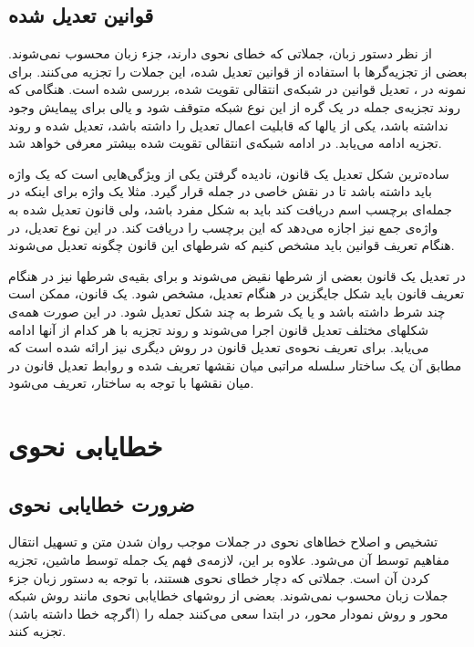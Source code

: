\documentclass{report}
\begin{document}
\subsection{قوانین تعدیل شده}
از نظر دستور زبان، جملاتی که خطای نحوی دارند، جز‌ء زبان محسوب نمی‌شوند. بعضی از تجزیه‌گرها با استفاده از قوانین تعدیل شده، این جملات را تجزیه می‌کنند. برای نمونه در \cite{ct5}، تعدیل قوانین در شبکه‌ی انتقالی تقویت شده، بررسی شده است. هنگامی که روند تجزیه‌ی جمله در یک گره از این نوع شبکه متوقف شود و یالی برای پیمایش وجود نداشته باشد، یکی از یالها که قابلیت اعمال تعدیل را داشته باشد، تعدیل شده و روند تجزیه ادامه می‌یابد. در ادامه شبکه‌ی انتقالی تقویت شده بیشتر معرفی خواهد شد.

ساده‌ترین شکل تعدیل یک قانون، نادیده‌ گرفتن یکی از ویژگی‌هایی است که یک واژه باید داشته باشد تا در نقش خاصی در جمله قرار گیرد. مثلا یک واژه برای اینکه در جمله‌ای برچسب اسم دریافت کند باید به شکل مفرد باشد، ولی قانون تعدیل شده به واژ‌ه‌ی جمع نیز اجازه می‌دهد که این برچسب را دریافت کند. در این نوع تعدیل، در هنگام تعریف قوانین باید مشخص کنیم که شرطهای این قانون چگونه تعدیل می‌شوند.

در تعدیل یک قانون بعضی از شرطها نقیض می‌شوند و برای بقیه‌ی شرطها نیز در هنگام تعریف قانون باید شکل جایگزین در هنگام تعدیل، مشخص شود. یک قانون، ممکن است چند شرط داشته باشد و یا یک شرط به چند شکل تعدیل شود. در این صورت همه‌ی شکلهای مختلف تعدیل قانون اجرا می‌شوند و روند تجزیه با هر کدام از آنها ادامه می‌یابد. برای تعریف نحوه‌ی تعدیل قانون در \cite{ct5} روش دیگری نیز ارائه شده است که مطابق آن یک ساختار سلسله مراتبی میان نقشها تعریف شده و روابط تعدیل قانون در میان نقشها با توجه به ساختار، تعریف می‌شود. 


\section{خطایابی نحوی}
\subsection{ضرورت خطایابی نحوی}
تشخیص و اصلاح خطاهای نحوی در جملات موجب روان شدن متن و تسهیل انتقال مفاهیم توسط آن می‌شود. علاوه بر این، لازمه‌ی فهم یک جمله توسط ماشین، تجزیه کردن آن است. جملاتی که دچار خطای نحوی هستند، با توجه به دستور زبان جزء جملات زبان محسوب نمی‌شوند. بعضی از روشهای خطایابی نحوی مانند روش شبکه محور و روش نمودار محور، در ابتدا سعی می‌کنند جمله را (اگرچه خطا داشته باشد) تجزیه کنند.
\end{document}
